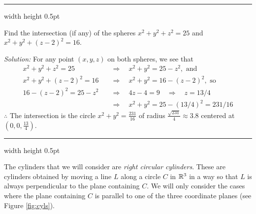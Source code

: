 \vspace{2mm}
\hrule width \textwidth height 0.5pt
\begin{exmp}\label{exmp:spheresphere}
 Find the intersection (if any) of the spheres $x^2 + y^2 + z^2 = 25$ and $x^2 + y^2 + (z - 2)^2 = 16$.\vspace{1mm}
 \par\noindent\emph{Solution:} For any point $(x,y,z)$ on both spheres, we see that
 \begin{align*}
  x^2 + y^2 + z^2 = 25 \quad &\Rightarrow \quad x^2 + y^2 = 25 -  z^2, \text{~and}\\
  x^2 + y^2 + (z - 2)^2 = 16 \quad &\Rightarrow \quad x^2 + y^2 = 16 - (z - 2)^2, \text{~so}\\
  16 - (z - 2)^2 = 25 -  z^2 \quad &\Rightarrow \quad  4z - 4 = 9 \quad
  \Rightarrow \quad z = 13/4\\
  &\Rightarrow \quad  x^2 + y^2 = 25 -  (13/4)^2 = 231/16
 \end{align*}
 $\therefore$ The intersection is the circle $x^2 + y^2 = \frac{231}{16}$ of radius $\frac{\sqrt{231}}{4} \approx 3.8$
 centered at $(0,0,\frac{13}{4})$.
\end{exmp}
\hrule width \textwidth height 0.5pt
\vspace{2mm}

The cylinders that we will consider are \emph{right circular cylinders}. These are
cylinders obtained by moving a line $L$ along a circle $C$ in
$\mathbb{R}^{3}$ in a way so that $L$ is always perpendicular to the plane containing $C$. We will only
consider the cases where the plane containing $C$ is parallel to one of the three coordinate
planes (see Figure \ref{fig:cyls}).

